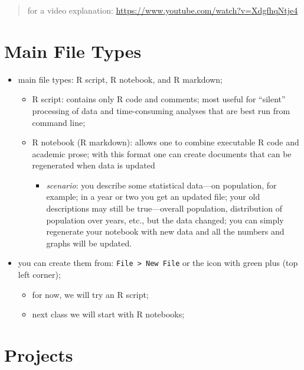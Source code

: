\documentclass[
]{book}
\providecommand{\tightlist}{%
  \setlength{\itemsep}{0pt}\setlength{\parskip}{0pt}}
\begin{document}
\begin{quote}
for a video explanation: \url{https://www.youtube.com/watch?v=XdgfhqNtje4}
\end{quote}

\hypertarget{main-file-types}{%
\section{Main File Types}\label{main-file-types}}

\begin{itemize}
\tightlist
\item
  main file types: R script, R notebook, and R markdown;

  \begin{itemize}
  \tightlist
  \item
    R script: contains only R code and comments; most useful for ``silent'' processing of data and time-consuming analyses that are best run from command line;
  \item
    R notebook (R markdown): allows one to combine executable R code and academic prose; with this format one can create documents that can be regenerated when data is updated

    \begin{itemize}
    \tightlist
    \item
      \emph{scenario}: you describe some statistical data---on population, for example; in a year or two you get an updated file; your old descriptions may still be true---overall population, distribution of population over years, etc., but the data changed; you can simply regenerate your notebook with new data and all the numbers and graphs will be updated.\\
    \end{itemize}
  \end{itemize}
\item
  you can create them from: \texttt{File\ \textgreater{}\ New\ File} or the icon with green plus (top left corner);

  \begin{itemize}
  \tightlist
  \item
    for now, we will try an R script;
  \item
    next class we will start with R notebooks;
  \end{itemize}
\end{itemize}

\hypertarget{projects}{%
\section{Projects}\label{projects}}
\end{document}
